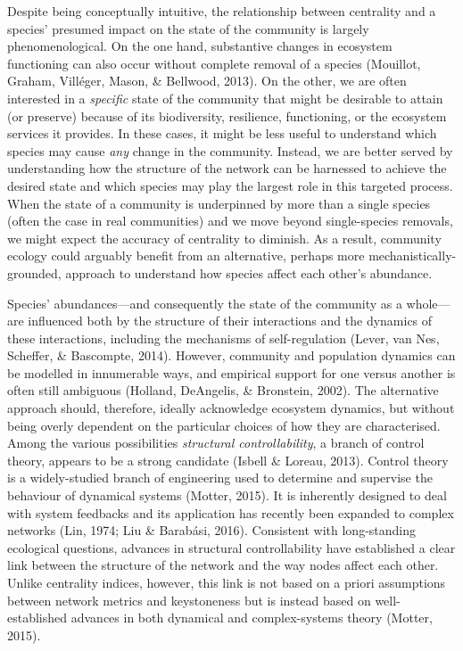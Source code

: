 \documentclass[a4paper]{artikel1}
\theoremstyle{definition}
\theoremstyle{definition}
\theoremstyle{definition}
\theoremstyle{remark}
\begin{document}
Despite being conceptually intuitive, the relationship between
centrality and a species' presumed impact on the state of the community
is largely phenomenological. On the one hand, substantive changes in
ecosystem functioning can also occur without complete removal of a
species (Mouillot, Graham, Villéger, Mason, \& Bellwood, 2013). On the
other, we are often interested in a \emph{specific} state of the
community that might be desirable to attain (or preserve) because of its
biodiversity, resilience, functioning, or the ecosystem services it
provides. In these cases, it might be less useful to understand which
species may cause \emph{any} change in the community. Instead, we are
better served by understanding how the structure of the network can be
harnessed to achieve the desired state and which species may play the
largest role in this targeted process. When the state of a community is
underpinned by more than a single species (often the case in real
communities) and we move beyond single-species removals, we might expect
the accuracy of centrality to diminish. As a result, community ecology
could arguably benefit from an alternative, perhaps more
mechanistically-grounded, approach to understand how species affect each
other's abundance.

Species' abundances---and consequently the state of the community as a
whole---are influenced both by the structure of their interactions and
the dynamics of these interactions, including the mechanisms of
self-regulation (Lever, van Nes, Scheffer, \& Bascompte, 2014). However,
community and population dynamics can be modelled in innumerable ways,
and empirical support for one versus another is often still ambiguous
(Holland, DeAngelis, \& Bronstein, 2002). The alternative approach
should, therefore, ideally acknowledge ecosystem dynamics, but without
being overly dependent on the particular choices of how they are
characterised. Among the various possibilities \emph{structural
controllability}, a branch of control theory, appears to be a strong
candidate (Isbell \& Loreau, 2013). Control theory is a widely-studied
branch of engineering used to determine and supervise the behaviour of
dynamical systems (Motter, 2015). It is inherently designed to deal with
system feedbacks and its application has recently been expanded to
complex networks (Lin, 1974; Liu \& Barabási, 2016). Consistent with
long-standing ecological questions, advances in structural
controllability have established a clear link between the structure of
the network and the way nodes affect each other. Unlike centrality
indices, however, this link is not based on a priori assumptions between
network metrics and keystoneness but is instead based on
well-established advances in both dynamical and complex-systems theory
(Motter, 2015).
\end{document}
